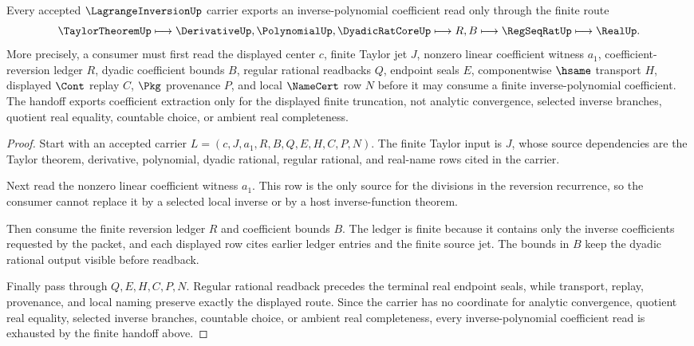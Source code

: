 \begin{theorem}
\label{thm:lagrange-inversion-taylor-polynomial-handoff}
Every accepted $\LagrangeInversionUp$ carrier exports an inverse-polynomial coefficient read only through the finite route
$$
\TaylorTheoremUp \longmapsto \DerivativeUp,\PolynomialUp,\DyadicRatCoreUp \longmapsto R,B \longmapsto \RegSeqRatUp \longmapsto \RealUp .
$$
More precisely, a consumer must first read the displayed center $c$, finite Taylor jet $J$, nonzero linear coefficient witness $a_1$, coefficient-reversion ledger $R$, dyadic coefficient bounds $B$, regular rational readbacks $Q$, endpoint seals $E$, componentwise $\hsame$ transport $H$, displayed $\Cont$ replay $C$, $\Pkg$ provenance $P$, and local $\NameCert$ row $N$ before it may consume a finite inverse-polynomial coefficient. The handoff exports coefficient extraction only for the displayed finite truncation, not analytic convergence, selected inverse branches, quotient real equality, countable choice, or ambient real completeness.
\end{theorem}
\begin{proof}
Start with an accepted carrier $L=(c,J,a_1,R,B,Q,E,H,C,P,N)$. The finite Taylor input is $J$, whose source dependencies are the Taylor theorem, derivative, polynomial, dyadic rational, regular rational, and real-name rows cited in the carrier.

Next read the nonzero linear coefficient witness $a_1$. This row is the only source for the divisions in the reversion recurrence, so the consumer cannot replace it by a selected local inverse or by a host inverse-function theorem.

Then consume the finite reversion ledger $R$ and coefficient bounds $B$. The ledger is finite because it contains only the inverse coefficients requested by the packet, and each displayed row cites earlier ledger entries and the finite source jet. The bounds in $B$ keep the dyadic rational output visible before readback.

Finally pass through $Q,E,H,C,P,N$. Regular rational readback precedes the terminal real endpoint seals, while transport, replay, provenance, and local naming preserve exactly the displayed route. Since the carrier has no coordinate for analytic convergence, quotient real equality, selected inverse branches, countable choice, or ambient real completeness, every inverse-polynomial coefficient read is exhausted by the finite handoff above.
\end{proof}

